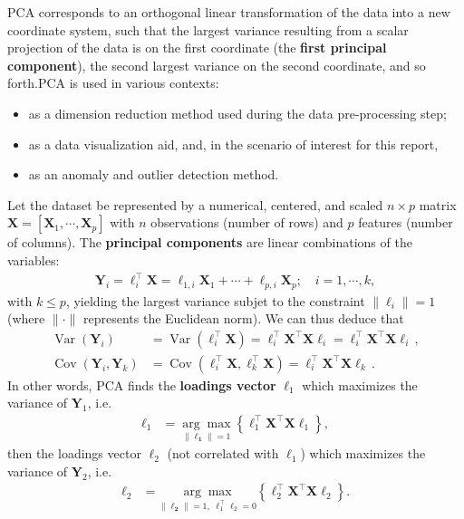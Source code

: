PCA corresponds to an orthogonal linear transformation of the data into a new coordinate system, such that the largest variance resulting from a scalar projection of the data is on the first coordinate (the \textbf{first principal component}), the second largest variance on the second coordinate, and so forth.\newl PCA is used in various contexts:
\begin{itemize}[noitemsep]
    \item as a dimension reduction method used during the data pre-processing step;
    \item as a data visualization aid, and, in the scenario of interest for this report, 
    \item as an anomaly and outlier detection method.
\end{itemize}
Let the dataset be represented by a numerical, centered, and scaled $n\times p$ matrix $\textbf{X}=[\textbf{X}_1,\cdots,\textbf{X}_p]$ with $n$ observations (number of rows) and $p$ features (number of columns). The \textbf{principal components} are linear combinations of the variables: 
\begin{align*}
\textbf{Y}_i=\ell^{\!\top}_i\textbf{X}=\ell_{1,i}\textbf{X}_1+\cdots+\ell_{p,i}\textbf{X}_p;\quad i=1,\cdots,k,
\end{align*}
with $k\leq p$, yielding the largest variance subjet to the constraint $\|\ell_i\|=1$ (where $\|\cdot\| $ represents the Euclidean norm). We can thus deduce that  
\begin{align*}
\operatorname{Var}\left(\textbf{Y}_{i}\right) &=\operatorname{Var}\left(\ell_{i}^{\!\top} \textbf{X} \right)=\ell_{i}^{\!\top} \textbf{X}^{\!\top} \textbf{X} \ell_{i}=\ell_{i}^{\!\top} \textbf{X}^{\!\top} \textbf{X} \ell_{i} \,,\\ 
\operatorname{Cov}\left(\textbf{Y}_{i}, \textbf{Y}_{k}\right) &=\operatorname{Cov}\left(\ell_{i}^{\!\top} \textbf{X}, \ell_{k}^{\!\top} \textbf{X}\right)=\ell_{i}^{\!\top}\textbf{X}^{\!\top} \textbf{X}\ell_{k}\, .
\end{align*}
In other words, PCA finds the \textbf{loadings vector} $\ell_{1}$ which maximizes the variance of $\textbf{Y}_1$, i.e. 
\begin{align*}
\mathbf{\ell}_{1}&=\underset{\|\mathbf{\ell_1}\|=1}{\arg \max }\left\{\ell^{\!\top}_1\textbf{X}^{\!\top} \textbf{X} \ell_1\right\},
\end{align*}
then the loadings vector $\ell_2$ (not correlated with $\ell_1$) which maximizes the variance of $\textbf{Y}_2$, i.e.   
\begin{align*}
\mathbf{\ell}_{2}& =\underset{\|\mathbf{\ell_2}\|=1,\; \ell_{1}^{\!\top}\ell_{2} =0}{\arg \max }\left\{\ell^{\!\top}_2\textbf{X}^{\!\top} \textbf{X} \ell_2\right\}.
\end{align*}
